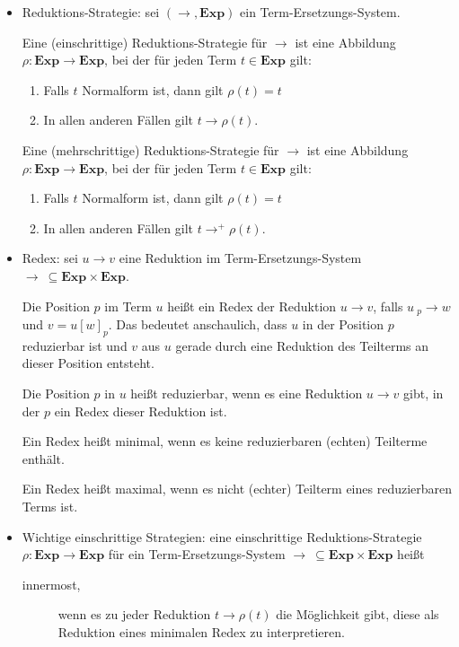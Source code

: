 \documentclass[
  a4paper,
  11pt,
]{scrartcl}
\newcommand{\prightarrow}{\ {}_p\!\!\rightarrow}
\begin{document}
\begin{itemize}
  \item Reduktions-Strategie: sei $(\rightarrow, \textbf{Exp})$ ein
    Term-Ersetzungs-System.

    Eine (einschrittige) Reduktions-Strategie für $\rightarrow$ ist eine
    Abbildung $\rho: \textbf{Exp} \rightarrow \textbf{Exp}$, bei der für jeden
    Term $t \in \textbf{Exp}$ gilt:
    \begin{enumerate}
      \item Falls $t$ Normalform ist, dann gilt $\rho(t) = t$
      \item In allen anderen Fällen gilt $t \rightarrow \rho(t)$.
    \end{enumerate}

    Eine (mehrschrittige) Reduktions-Strategie für $\rightarrow$ ist eine
    Abbildung $\rho: \textbf{Exp} \rightarrow \textbf{Exp}$, bei der für jeden
    Term $t \in \textbf{Exp}$ gilt:
    \begin{enumerate}
      \item Falls $t$ Normalform ist, dann gilt $\rho(t) = t$
      \item In allen anderen Fällen gilt $t \rightarrow^+ \rho(t)$.
    \end{enumerate}

  \item Redex: sei $u \rightarrow v$ eine Reduktion im Term-Ersetzungs-System
    $\rightarrow \ \subseteq \textbf{Exp} \times \textbf{Exp}$.

    Die Position $p$ im Term $u$ heißt ein Redex der Reduktion $u \rightarrow
    v$, falls $u \prightarrow w$ und $v = u{[w]}_p$. Das bedeutet anschaulich,
    dass $u$ in der Position $p$ reduzierbar ist und $v$ aus $u$ gerade durch
    eine Reduktion des Teilterms an dieser Position entsteht.

    Die Position $p$ in $u$ heißt reduzierbar, wenn es eine Reduktion $u
    \rightarrow v$ gibt, in der $p$ ein Redex dieser Reduktion ist.

    Ein Redex heißt minimal, wenn es keine reduzierbaren (echten) Teilterme
    enthält.

    Ein Redex heißt maximal, wenn es nicht (echter) Teilterm eines reduzierbaren
    Terms ist.

  \item Wichtige einschrittige Strategien: eine einschrittige
    Reduktions-Strategie $\rho : \textbf{Exp} \rightarrow \textbf{Exp}$ für ein
    Term-Ersetzungs-System $\rightarrow \ \subseteq \textbf{Exp} \times
    \textbf{Exp}$ heißt
    \begin{description}
      \item[innermost,] wenn es zu jeder Reduktion $t \rightarrow \rho(t)$ die
        Möglichkeit gibt, diese als Reduktion eines minimalen Redex zu
        interpretieren.


\end{description}
\end{itemize}
\end{document}
